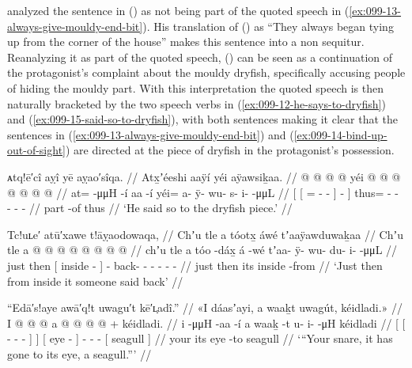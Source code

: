\citeauthor{swanton:1909} analyzed the sentence in (\lastx) as not being part of the quoted speech in (\ref{ex:099-13-always-give-mouldy-end-bit}).
His translation of (\lastx) as “They always began tying up from the corner of the house” makes this sentence into a non sequitur.
Reanalyzing it as part of the quoted speech, (\lastx) can be seen as a continuation of the protagonist’s complaint about the mouldy dryfish, specifically accusing people of hiding the mouldy part.
With this interpretation the quoted speech is then naturally bracketed by the two speech verbs in (\ref{ex:099-12-he-says-to-dryfish}) and (\ref{ex:099-15-said-so-to-dryfish}), with both sentences making it clear that the sentences in (\ref{ex:099-13-always-give-mouldy-end-bit}) and (\ref{ex:099-14-bind-up-out-of-sight}) are directed at the piece of dryfish in the protagonist’s possession.

\ex\label{ex:099-15-said-so-to-dryfish}%
%
\begingl
	\glpreamble	ᴀtq!ē′cî aỵî yē aỵao′sîqa. //
	\glpreamble	Atx̱ʼéeshi aaÿí yéi aÿawsiḵaa. //
	\gla	{} {}  @ {} @ {} @ {} {}  @ {} {}
		yéi @  @ {} @ {} @ {} @ {} @ {} @ {} //
	\glb	{} {} at=  -μμH -í {} aa -í {}
		yéi= a- ÿ- wu- s- i-  -μμL //
	\glc	{}[ {}[ =  - - {}]  - {}]
		thus= - - - -  - //
	\gld	{} {}  {} {} {} {} part -of {}
		thus  {} {} {} {} {} {} //
	\glft	‘He said so to the dryfish piece.’
		//
\endgl
\xe

\ex\label{ex:099-16-from-inside-said-back}%
%
\begingl
	\glpreamble	Tc!uʟe′ atū′xawe t!āỵaodowaqa, //
	\glpreamble	Chʼu tle a tóotx̱ áwé tʼaaÿawduwaḵaa //
	\gla	Chʼu tle {} a  @ {} {}  @ {}
		 @ {} @ {} @ {} @ {} @ {} @ {} //
	\glb	chʼu tle {} a tóo -dáx̱ {} á -wé
		tʼaa- ÿ- wu- du- i-  -μμL //
	\glc	just then {}[  inside - {}]  -
		back- - - - -  - //
	\gld	just then {} its inside -from {}  {}
		 {} {} {} {} {} {} //
	\glft	‘Just then from inside it someone said back’
		//
\endgl
\xe

\ex\label{ex:099-17-snare-eye-seagull}%
%
\begingl
	\glpreamble	“Edā′s!aye awā′q!t uwagu′t kē′ʟ̣adî.” //
	\glpreamble	«\!I dáasʼayi, a waaḵt uwagút, kéidladi.\!» //
	\gla	{} I {}  @ {} @ {} @ {} {} {}
		{} a  @ {} {}
		 @ {} @ {} @ {} +
		{} kéidladi. {} //
	\glb	{} i {}  -μμH -aa -í {} {}
		{} a waaḵ -t {}
		u- i-  -μH
		{} kéidladi {} //
	\glc	{}[  {}[  - - - {}] {}]
		{}[  eye - {}]
		- -  -
		{}[ seagull {}] //
	\gld	{} your {}  {} {} {} {} {}
		{} its eye -to {}
		 {} {} {}
		{} seagull {} //
	\glft	‘“Your snare, it has gone to its eye, a seagull.”’
		//
\endgl
\xe

